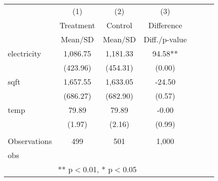 {\def\sym#1{\ifmmode^{#1}\else\(^{#1}\)\fi} \begin{tabular}{l*{3}{cc}} \hline
                    &\multicolumn{1}{c}{(1)}&\multicolumn{1}{c}{(2)}&\multicolumn{1}{c}{(3)}\\
                    &\multicolumn{1}{c}{Treatment}&\multicolumn{1}{c}{Control}&\multicolumn{1}{c}{Difference}\\
                    &     Mean/SD&     Mean/SD&Diff./p-value  \\
\hline
electricity         &    1,086.75&    1,181.33&       94.58**\\
                    &    (423.96)&    (454.31)&      (0.00)  \\
sqft                &    1,657.55&    1,633.05&      -24.50  \\
                    &    (686.27)&    (682.90)&      (0.57)  \\
temp                &       79.89&       79.89&       -0.00  \\
                    &      (1.97)&      (2.16)&      (0.99)  \\
 & & & \\
Observations        &         499&         501&       1,000  \\
obs                 &            &            &              \\
\hline \multicolumn{4}{c}{ ** p$<$0.01, * p$<$0.05} \\ \end{tabular} }
